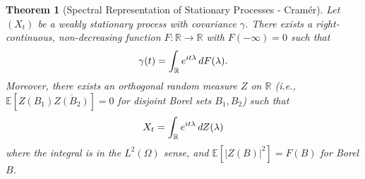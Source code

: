 \documentclass{article}
\newtheorem{theorem}{Theorem}
\newcommand{\R}{\mathbb{R}}
\newcommand{\E}{\mathbb{E}}
\newcommand{\1}{\mathbbm{1}}
\begin{document}
\begin{theorem}
  [Spectral Representation of Stationary Processes -
  Cram{\'e}r]\label{thm:cramer} Let $(X_t)$ be a weakly stationary process
  with covariance $\gamma$. There exists a right-continuous, non-decreasing
  function $F : \R \to \R$ with $F (- \infty) = 0$ such that
  \begin{equation}
    \gamma (t) = \int_{\R} e^{it \lambda}  \hspace{0.17em} dF (\lambda) . 
  \end{equation}
  Moreover, there exists an orthogonal random measure $Z$ on $\R$ (i.e., $\E
  [Z (B_1) \overline{Z (B_2)}] = 0$ for disjoint Borel sets $B_1, B_2$) such
  that
  \begin{equation}
    X_t = \int_{\R} e^{it \lambda}  \hspace{0.17em} dZ (\lambda)
  \end{equation}
  where the integral is in the $L^2 (\Omega)$ sense, and $\E [|Z (B) |^2] = F
  (B)$ for Borel $B$.
\end{theorem}
\end{document}
